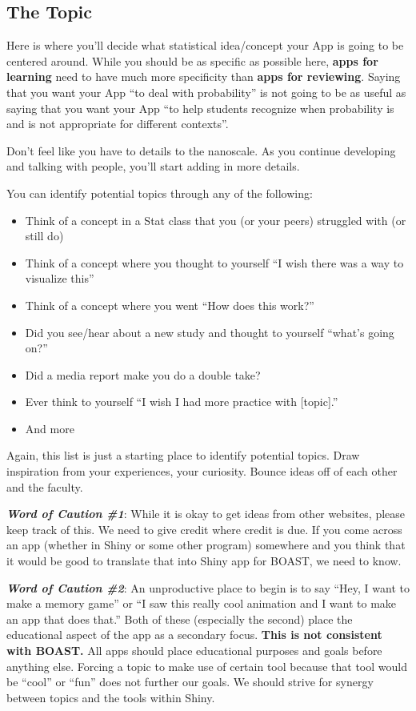 \documentclass[
]{book}
\providecommand{\tightlist}{%
  \setlength{\itemsep}{0pt}\setlength{\parskip}{0pt}}
\begin{document}
\hypertarget{step2b}{%
\subsection{The Topic}\label{step2b}}

Here is where you'll decide what statistical idea/concept your App is going to be centered around. While you should be as specific as possible here, \textbf{apps for learning} need to have much more specificity than \textbf{apps for reviewing}. Saying that you want your App ``to deal with probability'' is not going to be as useful as saying that you want your App ``to help students recognize when probability is and is not appropriate for different contexts''.

Don't feel like you have to details to the nanoscale. As you continue developing and talking with people, you'll start adding in more details.

You can identify potential topics through any of the following:

\begin{itemize}
\tightlist
\item
  Think of a concept in a Stat class that you (or your peers) struggled with (or still do)
\item
  Think of a concept where you thought to yourself ``I wish there was a way to visualize this''
\item
  Think of a concept where you went ``How does this work?''
\item
  Did you see/hear about a new study and thought to yourself ``what's going on?''
\item
  Did a media report make you do a double take?
\item
  Ever think to yourself ``I wish I had more practice with {[}topic{]}.''
\item
  And more
\end{itemize}

Again, this list is just a starting place to identify potential topics. Draw inspiration from your experiences, your curiosity. Bounce ideas off of each other and the faculty.

\emph{\textbf{Word of Caution \#1}}: While it is okay to get ideas from other websites, please keep track of this. We need to give credit where credit is due. If you come across an app (whether in Shiny or some other program) somewhere and you think that it would be good to translate that into Shiny app for BOAST, we need to know.

\emph{\textbf{Word of Caution \#2}}: An unproductive place to begin is to say ``Hey, I want to make a memory game'' or ``I saw this really cool animation and I want to make an app that does that.'' Both of these (especially the second) place the educational aspect of the app as a secondary focus. \textbf{This is not consistent with BOAST.} All apps should place educational purposes and goals before anything else. Forcing a topic to make use of certain tool because that tool would be ``cool'' or ``fun'' does not further our goals. We should strive for synergy between topics and the tools within Shiny.
\end{document}
